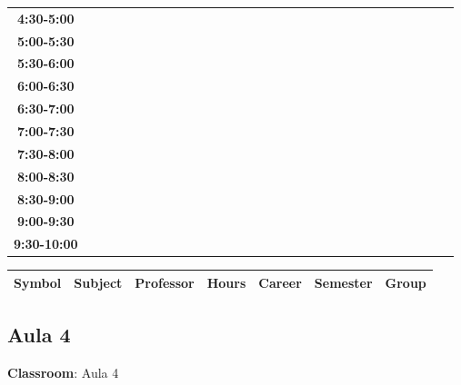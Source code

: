 \documentclass{article}
\begin{document}
\begin{table}[ht]
\begin{tabular}{|c|c|c|c|c|c|c|c|c|c|c|c|c|c|c|c|c|c|c|c|c|c|c|c|c|c|c|c|c|c|}
 \cline{1-8} 
\textbf{4:30-5:00} &   &   &   &   &   &   &   \\
 \cline{1-8} 
\textbf{5:00-5:30} &   &   &   &   &   &   &   \\
 \cline{1-8} 
\textbf{5:30-6:00} &   &   &   &   &   &   &   \\
 \cline{1-8} 
\textbf{6:00-6:30} &   &   &   &   &   &   &   \\
 \cline{1-8} 
\textbf{6:30-7:00} &   &   &   &   &   &   &   \\
 \cline{1-8} 
\textbf{7:00-7:30} &   &   &   &   &   &   &   \\
 \cline{1-8} 
\textbf{7:30-8:00} &   &   &   &   &   &   &   \\
 \cline{1-8} 
\textbf{8:00-8:30} &   &   &   &   &   &   &   \\
 \cline{1-8} 
\textbf{8:30-9:00} &   &   &   &   &   &   &   \\
 \cline{1-8} 
\textbf{9:00-9:30} &   &   &   &   &   &   &   \\
 \cline{1-8} 
\textbf{9:30-10:00} &   &   &   &   &   &   &   \\
 \cline{1-8} 
\end{tabular}\end{table}

        
        \begin{tabular}{|>{\centering\arraybackslash}m{2cm}|>{\centering\arraybackslash}m{4cm}|>{\centering\arraybackslash}m{2.15cm}|>{\centering\arraybackslash}m{1.8cm}|>{\centering\arraybackslash}m{2cm}|>{\centering\arraybackslash}m{2cm}|>{\centering\arraybackslash}m{2cm}|}
        \hline
        \textbf{Symbol} & \textbf{Subject} & \textbf{Professor} & \textbf{Hours} & \textbf{Career} & \textbf{Semester} & \textbf{Group} \\
        \hline
        \end{tabular}
                    

        \newpage
        

        \subsection{Aula 4}
        \vspace*{.1cm}
        
        \begin{flushright}
            {\LARGE \textbf{Classroom}: Aula 4}
        \end{flushright}
        \vspace{1cm}
\end{document}
